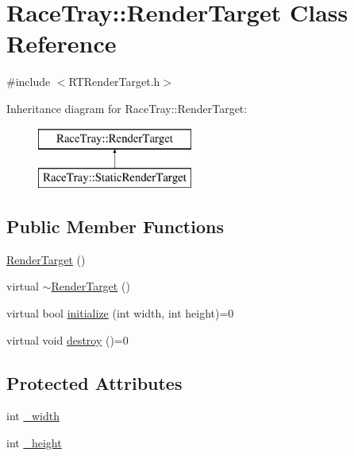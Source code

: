 \hypertarget{class_race_tray_1_1_render_target}{\section{Race\-Tray\-:\-:Render\-Target Class Reference}
\label{class_race_tray_1_1_render_target}
}


{\ttfamily \#include $<$R\-T\-Render\-Target.\-h$>$}

Inheritance diagram for Race\-Tray\-:\-:Render\-Target\-:\begin{figure}[H]
\begin{center}
\leavevmode
\includegraphics[height=2.000000cm]{class_race_tray_1_1_render_target}
\end{center}
\end{figure}
\subsection*{Public Member Functions}
\begin{DoxyCompactItemize}
\item 
\hyperlink{class_race_tray_1_1_render_target_a19af1e6e8c1d05d95f8a3d6443540d85}{Render\-Target} ()
\item 
virtual \hyperlink{class_race_tray_1_1_render_target_a18c35ced54cd155cd654efbac788e3a1}{$\sim$\-Render\-Target} ()
\item 
virtual bool \hyperlink{class_race_tray_1_1_render_target_a8ac06cc0f9af87e3373cd1514f64b76c}{initialize} (int width, int height)=0
\item 
virtual void \hyperlink{class_race_tray_1_1_render_target_a9e4e394b421102e5edaea14411dc28bd}{destroy} ()=0
\end{DoxyCompactItemize}
\subsection*{Protected Attributes}
\begin{DoxyCompactItemize}
\item 
int \hyperlink{class_race_tray_1_1_render_target_a26912f27dd5d06467d2144049610057d}{\-\_\-width}
\item 
int \hyperlink{class_race_tray_1_1_render_target_af3c0dcb0091c5c5be2b3350fa8dce79b}{\-\_\-height}
\end{DoxyCompactItemize}


